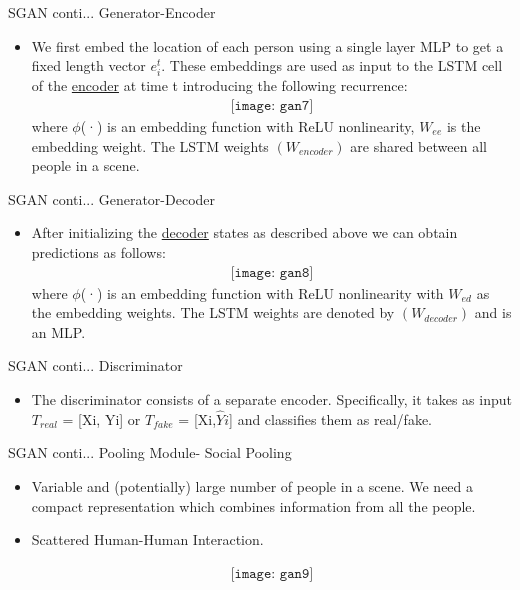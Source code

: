 \documentclass{beamer}
\begin{document}
\begin{frame}{SGAN conti...} 
\huge Generator-Encoder
 \begin{itemize}
    \item \large We first embed the location of each person
using a single layer MLP to get a fixed length vector $e^t_{i}$.
These embeddings are used as input to the LSTM cell of the \underline {encoder} at time t introducing the following recurrence:
 \begin{align*}
    \texttt{[image: gan7]}  
\end{align*}
where $\phi$(·) is an embedding function with ReLU nonlinearity,
$W_{ee}$ is the embedding weight. The LSTM weights $(W_{encoder})$ are shared between all people in a scene.
 \end{itemize}
\end{frame}

\begin{frame}{SGAN conti...} 
\huge Generator-Decoder
 \begin{itemize}
    \item \large After initializing the \underline {decoder} states as described above we can obtain predictions as follows:
 \begin{align*}
    \texttt{[image: gan8]}  
\end{align*}
where $\phi$(·) is an embedding function with ReLU nonlinearity
with $W_{ed}$ as the embedding weights. The LSTM
weights are denoted by $(W_{decoder})$ and is an MLP.
 \end{itemize}
\end{frame}
\begin{frame}{SGAN conti...} 
\huge Discriminator\\
 \begin{itemize}
    \item \Large The discriminator consists of a separate
encoder. Specifically, it takes as input $T_{real}$ = [Xi, Yi] or
$T_{fake}$ = [Xi,$\hat Yi$] and classifies them as real/fake.
\end{itemize}
\end{frame}
\begin{frame}{SGAN conti...} 
\huge Pooling Module- \Large Social Pooling\\
 \begin{itemize}
    \item \Large Variable and (potentially) large number of people in a scene. We need a compact representation which combines information from all the people.
    \item \Large Scattered Human-Human Interaction.
    
     \begin{align*}
    \texttt{[image: gan9]}  
\end{align*}
\end{itemize}
\end{frame}
\end{document}
